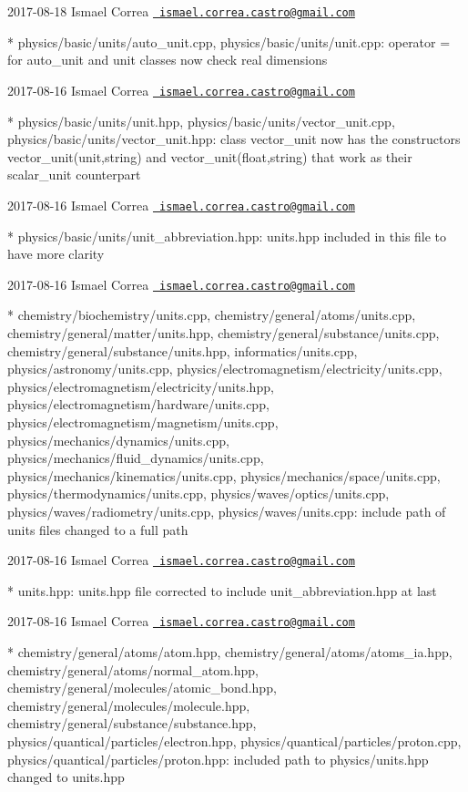  2017-\/08-\/18 Ismael Correa \href{mailto:ismael.correa.castro@gmail.com}{\texttt{ ismael.\+correa.\+castro@gmail.\+com}} \begin{DoxyVerb}* physics/basic/units/auto_unit.cpp, physics/basic/units/unit.cpp: 
operator = for auto_unit and unit classes now check real dimensions
\end{DoxyVerb}
 2017-\/08-\/16 Ismael Correa \href{mailto:ismael.correa.castro@gmail.com}{\texttt{ ismael.\+correa.\+castro@gmail.\+com}} \begin{DoxyVerb}* physics/basic/units/unit.hpp,
physics/basic/units/vector_unit.cpp,
physics/basic/units/vector_unit.hpp: class vector_unit now has the
constructors vector_unit(unit,string) and vector_unit(float,string)
that work as their scalar_unit counterpart
\end{DoxyVerb}
 2017-\/08-\/16 Ismael Correa \href{mailto:ismael.correa.castro@gmail.com}{\texttt{ ismael.\+correa.\+castro@gmail.\+com}} \begin{DoxyVerb}* physics/basic/units/unit_abbreviation.hpp: units.hpp included in
this file to have more clarity
\end{DoxyVerb}
 2017-\/08-\/16 Ismael Correa \href{mailto:ismael.correa.castro@gmail.com}{\texttt{ ismael.\+correa.\+castro@gmail.\+com}} \begin{DoxyVerb}* chemistry/biochemistry/units.cpp,
chemistry/general/atoms/units.cpp,
chemistry/general/matter/units.hpp,
chemistry/general/substance/units.cpp,
chemistry/general/substance/units.hpp, informatics/units.cpp,
physics/astronomy/units.cpp,
physics/electromagnetism/electricity/units.cpp,
physics/electromagnetism/electricity/units.hpp,
physics/electromagnetism/hardware/units.cpp,
physics/electromagnetism/magnetism/units.cpp,
physics/mechanics/dynamics/units.cpp,
physics/mechanics/fluid_dynamics/units.cpp,
physics/mechanics/kinematics/units.cpp,
physics/mechanics/space/units.cpp,
physics/thermodynamics/units.cpp, physics/waves/optics/units.cpp,
physics/waves/radiometry/units.cpp, physics/waves/units.cpp: include
path of units files changed to a full path
\end{DoxyVerb}
 2017-\/08-\/16 Ismael Correa \href{mailto:ismael.correa.castro@gmail.com}{\texttt{ ismael.\+correa.\+castro@gmail.\+com}} \begin{DoxyVerb}* units.hpp: units.hpp file corrected to include
unit_abbreviation.hpp at last
\end{DoxyVerb}
 2017-\/08-\/16 Ismael Correa \href{mailto:ismael.correa.castro@gmail.com}{\texttt{ ismael.\+correa.\+castro@gmail.\+com}} \begin{DoxyVerb}* chemistry/general/atoms/atom.hpp,
chemistry/general/atoms/atoms_ia.hpp,
chemistry/general/atoms/normal_atom.hpp,
chemistry/general/molecules/atomic_bond.hpp,
chemistry/general/molecules/molecule.hpp,
chemistry/general/substance/substance.hpp,
physics/quantical/particles/electron.hpp,
physics/quantical/particles/proton.cpp,
physics/quantical/particles/proton.hpp: included path to
physics/units.hpp changed to units.hpp
\end{DoxyVerb}
